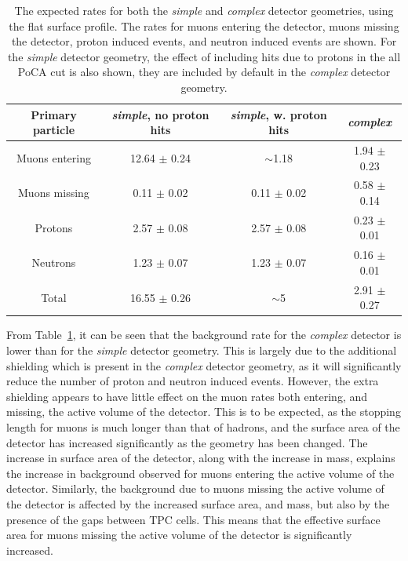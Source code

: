 \begin{table}
  \caption[The expected rates for both the \emph{simple} and \emph{complex} detector geometries, using the flat surface profile]
          {The expected rates for both the \emph{simple} and \emph{complex} detector geometries, using the flat surface profile. The rates for muons entering the detector, muons missing the detector, proton induced events, and neutron induced events are shown. For the \emph{simple} detector geometry, the effect of including hits due to protons in the all PoCA cut is also shown, they are included by default in the \emph{complex} detector geometry.}
  \centering
  \label{tab:SimpSurfRates}
  \begin{tabular}{c c c c}
    \toprule
        {Primary particle} & {\emph{simple}, no proton hits} & {\emph{simple}, w. proton hits} & {\emph{complex}} \\ 
        \midrule
        Muons entering     & 12.64 $\pm$ 0.24                & $\sim$1.18                      & 1.94 $\pm$ 0.23  \\

        Muons missing      & 0.11 $\pm$ 0.02                 & 0.11 $\pm$ 0.02                 & 0.58 $\pm$ 0.14  \\

        Protons            & 2.57 $\pm$ 0.08                 & 2.57 $\pm$ 0.08                 & 0.23 $\pm$ 0.01  \\

        Neutrons           & 1.23 $\pm$ 0.07                 & 1.23 $\pm$ 0.07                 & 0.16 $\pm$ 0.01  \\

        Total              & 16.55 $\pm$ 0.26                & $\sim$5                         & 2.91 $\pm$ 0.27  \\
    \bottomrule
  \end{tabular}
\end{table}

From Table~\ref{tab:SimpSurfRates}, it can be seen that the background rate for the \emph{complex} detector is lower than for the \emph{simple} detector geometry. This is largely due to the additional shielding which is present in the \emph{complex} detector geometry, as it will significantly reduce the number of proton and neutron induced events. However, the extra shielding appears to have little effect on the muon rates both entering, and missing, the active volume of the detector. This is to be expected, as the stopping length for muons is much longer than that of hadrons, and the surface area of the detector has increased significantly as the geometry has been changed. The increase in surface area of the detector, along with the increase in mass, explains the increase in background observed for muons entering the active volume of the detector. Similarly, the background due to muons missing the active volume of the detector is affected by the increased surface area, and mass, but also by the presence of the gaps between TPC cells. This means that the effective surface area for muons missing the active volume of the detector is significantly increased. \\

